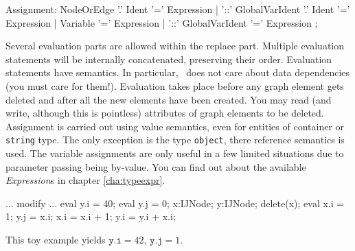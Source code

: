 \begin{rail}
  Assignment:
	  NodeOrEdge '.' Ident '=' Expression |
	  '::' GlobalVarIdent '.' Ident '=' Expression |
	  Variable '=' Expression |
	  '::' GlobalVarIdent '=' Expression
	;
\end{rail}
Several evaluation parts are allowed within the replace part.
Multiple evaluation statements will be internally concatenated, preserving their order.
Evaluation statements have  semantics.
In particular, \GrG\ does not care about data dependencies (you must care for them!).
Evaluation takes place before any graph element gets deleted and after all the new elements have been created.
You may read (and write, although this is pointless) attributes of graph elements to be deleted.
Assignment is carried out using value semantics, even for entities of container or \texttt{string} type.
The only exception is the type \texttt{object}, there reference semantics is used.
The variable assignments are only useful in a few limited situations due to parameter passing being by-value.
You can find out about the available \emph{Expression}s in chapter \ref{cha:typeexpr}.

\begin{example}
\begin{grgen}
...
modify {
  ...
  eval { y.i = 40; }
  eval { y.j = 0;  }
  x:IJNode;
  y:IJNode;
  delete(x);
  eval {
    x.i = 1;
    y.j = x.i;
    x.i = x.i + 1;
    y.i = y.i + x.i;
  }
}
\end{grgen}
This toy example yields $\texttt{y.i} = 42$, $\texttt{y.j} = 1$.
\end{example}


